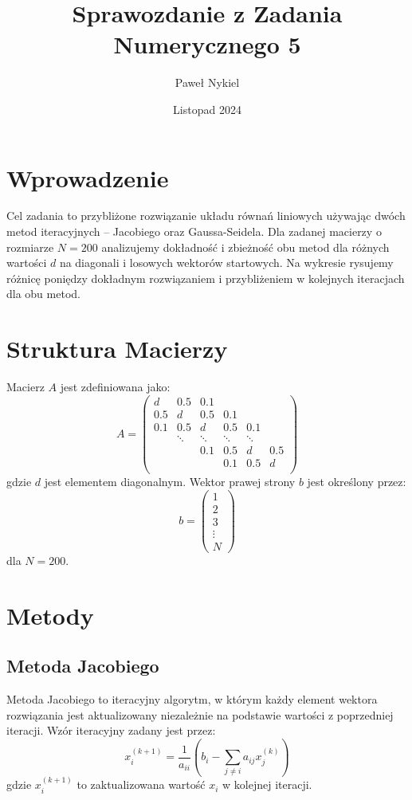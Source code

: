 \documentclass{article}
\title{Sprawozdanie z Zadania Numerycznego 5}
\author{Paweł Nykiel}
\date{Listopad 2024}
\begin{document}
\maketitle

\section{Wprowadzenie}
Cel zadania to przybliżone rozwiązanie układu równań liniowych używając dwóch metod iteracyjnych – Jacobiego oraz Gaussa-Seidela.
Dla zadanej macierzy o rozmiarze \( N = 200 \) analizujemy dokładność i zbieżność obu metod dla różnych wartości \( d \) na diagonali
i losowych wektorów startowych. Na wykresie rysujemy różnicę poniędzy dokładnym rozwiązaniem i przybliżeniem w kolejnych iteracjach
dla obu metod.




\section{Struktura Macierzy}
Macierz \( A \) jest zdefiniowana jako:
\[
A = \begin{pmatrix}
d & 0.5 & 0.1 & & &  \\
0.5 & d & 0.5 & 0.1 & & \\
0.1 & 0.5 & d & 0.5 & 0.1 & \\
& \ddots & \ddots & \ddots & \ddots & \\
& & 0.1 & 0.5 & d & 0.5 \\
& & & 0.1 & 0.5 & d \\
\end{pmatrix}
\]
gdzie \( d \) jest elementem diagonalnym. Wektor prawej strony \( b \) jest określony przez:
\[
b = \begin{pmatrix} 1 \\ 2 \\ 3 \\ \vdots \\ N \end{pmatrix}
\]
dla \( N = 200 \).

\section{Metody}

\subsection{Metoda Jacobiego}
Metoda Jacobiego to iteracyjny algorytm, w którym każdy element wektora rozwiązania jest aktualizowany
niezależnie na podstawie wartości z poprzedniej iteracji. Wzór iteracyjny zadany jest przez:
\[
x_i^{(k+1)} = \frac{1}{a_{ii}} \left(b_i - \sum_{j \neq i} a_{ij} x_j^{(k)} \right)
\]
gdzie \( x_i^{(k+1)} \) to zaktualizowana wartość \( x_i \) w kolejnej iteracji.
\end{document}
